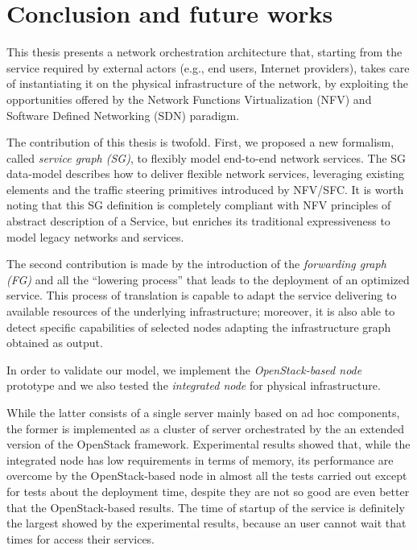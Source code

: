 \chapter{Conclusion and future works}
\label{chap:Conclusions}
\label{sec:conclusion}

This thesis presents a network orchestration architecture that, starting from the service required by external actors (e.g., end users, Internet providers), takes care of instantiating it on the physical infrastructure of the network, by exploiting the opportunities offered by the Network Functions Virtualization (NFV) and Software Defined Networking (SDN) paradigm.


The contribution of this thesis is twofold. First, we proposed a new formalism, called \textit{service graph (SG)}, to flexibly model end-to-end network services. 
The SG data-model describes how to deliver flexible network services, leveraging existing elements and the traffic steering primitives introduced by NFV/SFC. 
It is worth noting that this SG definition is completely compliant with NFV principles of abstract description of a Service, but enriches its traditional expressiveness to model legacy networks and services. 

The second contribution is made by the introduction of the \textit{forwarding graph (FG)} and all the ``lowering process'' that leads to the deployment of an optimized service. This process of translation is capable to adapt the service delivering to available resources of the underlying infrastructure; moreover, it is also able to detect specific capabilities of selected nodes adapting the infrastructure graph obtained as output. 

In order to validate our model, we implement the \textit{OpenStack-based node} prototype and we also tested the \textit{integrated node} for physical infrastructure.

While the latter consists of a single server mainly based on ad hoc components, the former is implemented as a cluster of server orchestrated by the an extended version of the OpenStack framework.
Experimental results showed that, while the integrated node has low requirements in terms of memory, its performance are overcome by the OpenStack-based node in almost all the tests carried out except for tests about the deployment time, despite they are not so good are even better that the OpenStack-based results. The time of startup of the service is definitely the largest showed by the experimental results, because an user cannot wait that times for access their services.

